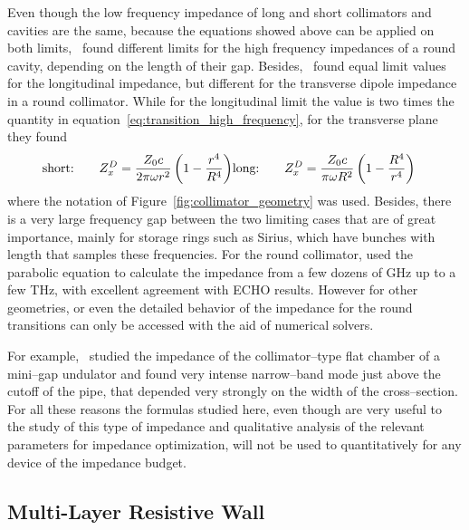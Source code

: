     Even though the low frequency impedance of long and short collimators and cavities are the same, because the equations showed above can be applied on both limits,~ found different limits for the high frequency impedances of a round cavity, depending on the length of their gap. Besides,~ found equal limit values for the longitudinal impedance, but different for the transverse dipole impedance in a round collimator. While for the longitudinal limit the value is two times the quantity in equation~\eqref{eq:transition_high_frequency}, for the transverse plane they found
    \begin{align}
        \text{short:}\quad\quad Z_x^D = \frac{Z_0c}{2\pi\omega r^2}\left(1-\frac{r^4}{R^4}\right) &
        \text{long:}\quad\quad Z_x^D = \frac{Z_0c}{\pi\omega R^2}\left(1-\frac{R^4}{r^4}\right)
    \end{align}
    where the notation of Figure~\ref{fig:collimator_geometry} was used. Besides, there is a very large frequency gap between the two limiting cases that are of great importance, mainly for storage rings such as Sirius, which have bunches  with length that samples these frequencies. For the round collimator,  used the parabolic equation to calculate the impedance from a few dozens of \si{\giga\hertz} up to a few \si{\tera\hertz}, with excellent agreement with ECHO results. However for other geometries, or even the detailed behavior of the impedance for the round transitions can only be accessed with the aid of numerical solvers.

    For example,~ studied the impedance of the collimator--type flat chamber of a mini--gap undulator and found very intense narrow--band mode just above the cutoff of the pipe, that depended very strongly on the width of the cross--section. For all these reasons the formulas studied here, even though are very useful to the study of this type of impedance and qualitative analysis of the relevant parameters for impedance optimization, will not be used to quantitatively for any device of the impedance budget.

\subsection{Multi-Layer Resistive Wall}

